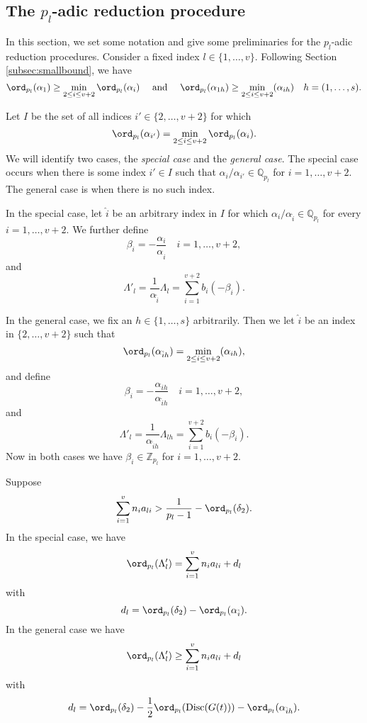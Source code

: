 {%

\subsection{The $p_l$-adic reduction procedure}

In this section, we set some notation and give some preliminaries for the $p_l$-adic reduction procedures. Consider a fixed index $l \in \{1, \dots, v\}$. Following Section \ref{subsec:smallbound}, we have
\[\ord_{p_l}(\alpha_1) \geq \min_{2\leq i\leq v+2} \ord_{p_l}(\alpha_i) \quad \text{ and } \quad \ord_{p_l}(\alpha_{1h}) \geq \min_{2\leq i\leq v+2}(\alpha_{ih}) \quad h = (1, \dots, s).\]

Let $I$ be the set of all indices $i' \in \{2, \dots, v+2\}$ for which
\[\ord_{p_l}(\alpha_{i'}) = \min_{2\leq i\leq v+2} \ord_{p_l}(\alpha_i).\]
We will identify two cases, the \textit{special case} and the \textit{general case}. The special case occurs when there is some index $i' \in I$ such that $\alpha_i/\alpha_{i'} \in \mathbb{Q}_{p_l}$ for $i = 1, \dots, v+2$. The general case is when there is no such index. 

In the special case, let $\hat{i}$ be an arbitrary index in $I$ for which $\alpha_i/\alpha_{\hat{i}} \in \mathbb{Q}_{p_l}$ for every $i = 1, \dots, v+2$. We further define
\[\beta_i = - \frac{\alpha_i}{\alpha_{\hat{i}}} \quad i = 1, \dots, v+2,\]
and 
\[\Lambda'_l = \frac{1}{\alpha_{\hat{i}}}\Lambda_l = \sum_{i = 1}^{v+2} b_i(-\beta_i).\]

In the general case, we fix an $h \in \{1, \dots, s\}$ arbitrarily. Then we let $\hat{i}$ be an index in $\{2, \dots, v+2\}$ such that 
\[ \ord_{p_l}(\alpha_{\hat{i}h}) = \min_{2\leq i\leq v+2}(\alpha_{ih}),\]
and define
\[\beta_i = - \frac{\alpha_{ih}}{\alpha_{\hat{i}h}} \quad i = 1, \dots, v+2,\]
and 
\[\Lambda'_l = \frac{1}{\alpha_{\hat{i}h}}\Lambda_{lh} = \sum_{i = 1}^{v+2} b_i(-\beta_i).\]
Now in both cases we have $\beta_i \in \mathbb{Z}_{p_l}$ for $i = 1, \dots, v+2$. 

\begin{lemma} \label{Lem:19.1}
Suppose
\[\sum_{i = 1}^v n_{i}a_{li} > \frac{1}{p_l-1} - \ord_{p_l}(\delta_2).\]
In the special case, we have 
\[\ord_{p_l}(\Lambda_l') = \sum_{i = 1}^v n_{i}a_{li} + d_l\]
with
\[d_l = \ord_{p_l}(\delta_2) - \ord_{p_l}(\alpha_{\hat{i}}).\]
In the general case we have
\[\ord_{p_l}(\Lambda_{l}') \geq \sum_{i = 1}^v n_{i}a_{li} + d_l\]
with 
\[d_l = \ord_{p_l}(\delta_2) - \frac{1}{2}\ord_{p_l}(\text{Disc}(G(t))) - \ord_{p_l}(\alpha_{\hat{i}h}).\]
\end{lemma}

}
